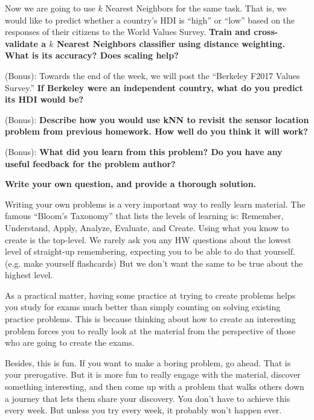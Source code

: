 \begin{Parts}
\Part Now we are going to use $k$ Nearest Neighbors for the same task. That is, we would like to predict whether a country's HDI is ``high'' or ``low'' based on the responses of their citizens to the World Values Survey. \textbf{Train and cross-validate a $k$ Nearest Neighbors classifier using distance weighting. What is its accuracy? Does scaling help?}




\Part (Bonus): Towards the end of the week, we will post the ``Berkeley F2017 Values Survey.'' \textbf{If Berkeley were an independent country, what do you predict its HDI would be?}

\Part (Bonus): \textbf{Describe how you would use kNN to revisit the sensor location problem from previous homework. How well do you think it will work?}

\Part (Bonus): \textbf{What did you learn from this problem? Do you have any useful feedback for the problem author?}

\end{Parts}

{\bf Write your own question, and provide a thorough solution.}

Writing your own problems is a very important way to really learn
material. The famous ``Bloom's Taxonomy'' that lists the levels of
learning is: Remember, Understand, Apply, Analyze, Evaluate, and
Create. Using what you know to create is the top-level. We rarely ask
you any HW questions about the lowest level of straight-up
remembering, expecting you to be able to do that yourself. (e.g. make
yourself flashcards) But we don't want the same to be true about the
highest level.

As a practical matter, having some practice at trying to create
problems helps you study for exams much better than simply counting on
solving existing practice problems. This is because thinking about how
to create an interesting problem forces you to really look at the
material from the perspective of those who are going to create the
exams. 

Besides, this is fun. If you want to make a boring problem, go
ahead. That is your prerogative. But it is more fun to really engage
with the material, discover something interesting, and then come up
with a problem that walks others down a journey that lets them share
your discovery. You don't have to achieve this every week. But unless
you try every week, it probably won't happen ever. 